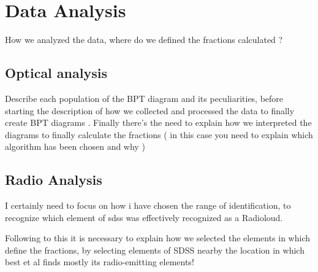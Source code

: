 \section{Data Analysis}
How we analyzed the data, where do we defined the fractions calculated ?
\subsection{Optical analysis}
Describe each population of the BPT diagram and its peculiarities, before starting the description of how we collected and processed the data to finally create BPT diagrams .
Finally there's the need to explain how we interpreted the diagrams to finally calculate the fractions ( in this case you need to explain which algorithm has been chosen and why ) 


\subsection{Radio Analysis}
I certainly need to focus on how i have chosen the range of identification, to recognize which element of sdss was effectively recognized as a Radioloud.

Following to this it is necessary to explain how we selected the elements in which define the fractions, by selecting elements of SDSS nearby the location in which best et al finds mostly its radio-emitting elements!